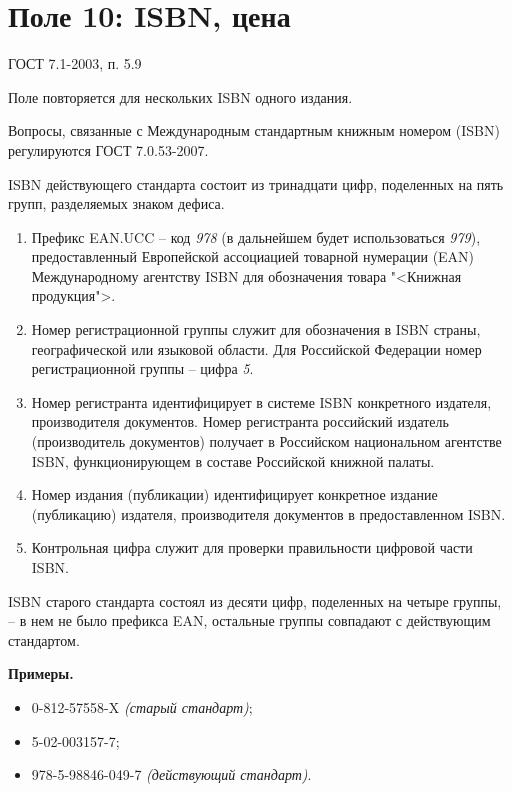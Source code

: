 \chapter{Поле 10: ISBN, цена}

ГОСТ 7.1-2003, п. 5.9 %

Поле повторяется для нескольких ISBN одного издания.
 
Вопросы, связанные с Международным стандартным книжным номером (ISBN) регулируются ГОСТ 7.0.53-2007.

ISBN действующего стандарта состоит из тринадцати цифр, поделенных на пять групп, разделяемых знаком дефиса.

\begin{enumerate}
    \item Префикс EAN.UCC -- код \emph{978} (в дальнейшем будет использоваться \emph{979}), предоставленный Европейской ассоциацией товарной нумерации (EAN) Международному агентству ISBN для обозначения товара "<Книжная продукция">.
    \item Номер регистрационной группы служит для обозначения в ISBN страны, географической или языковой области. Для Российской Федерации номер регистрационной группы -- цифра \emph{5}.
    \item Номер регистранта идентифицирует в системе ISBN конкретного издателя, производителя документов. Номер регистранта российский издатель (производитель документов) получает в Российском национальном агентстве ISBN, функционирующем в составе Российской книжной палаты.
    \item Номер издания (публикации) идентифицирует конкретное издание (публикацию) издателя, производителя документов в предоставленном ISBN.
    \item Контрольная цифра служит для проверки правильности цифровой части ISBN.
\end{enumerate}

ISBN старого стандарта состоял из десяти цифр, поделенных на четыре группы, -- в нем не было префикса EAN, остальные группы совпадают с действующим стандартом.

\textbf{Примеры.}

\begin{itemize}
	\item 0-812-57558-X \textit{(старый стандарт)};
	\item 5-02-003157-7;
	\item 978-5-98846-049-7 \textit{(действующий стандарт)}.
\end{itemize}

